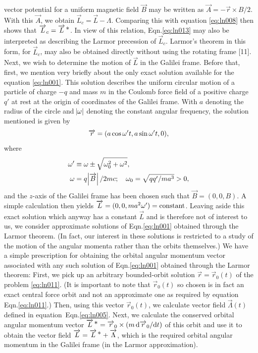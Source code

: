 vector potential for a uniform magnetic field $\vec{B}$ may 
be written as $\vec{A} = -\vec{r}\times{B}/2$. With this 
$\vec{A}$, we obtain $\vec{L}_{c} = \vec{L} - \Lambda$. 
Comparing this with equation \eqref{eq:ln008} then shows 
that $\overrightarrow{L}_{c} = {\overrightarrow{L}^{\,{\textstyle \ast}}}$. In view of this relation, 
Eqn.\eqref{eq:ln013} may also be interpreted as 
describing the Larmor precession of $\vec{L}_{c}$. Larmor's 
theorem in this form, for $\vec{L}_{c}$, may also be 
obtained directly without using the rotating frame [11]. 
Next, we wish to determine the motion of $\vec{L}$ in the 
Galilei frame. Before that, first, we mention very briefly 
about the only exact solution available for the equation 
\eqref{eq:ln001}. This solution describes the uniform 
circular  motion of a particle of charge $-q$ and mass $m$ 
in the Coulomb force field of a positive charge $q'$ at 
rest 
at the origin of coordinates of the Galilei frame. With $a$ 
denoting the radius of the circle and $\abs{{\omega}}$ denoting 
the constant angular frequency, the solution mentioned is 
given by
\begin{align*}
\overrightarrow{r} = (a \cos{\omega}' t, a \sin{\omega}' t, 0), 
\end{align*} 
where
\vspace{-1\bsk}
\begin{align*}
{\omega}' &\equiv {\omega} \pm
\sqrt{{\omega}_{0}^{2} + {\omega}^{2}},\notag\\
{\omega} 
&  = q \abs{\overrightarrow{B}}/2mc;\quad
{\omega}_{0}= \sqrt{qq'/ma^{3}} > 0, 
\end{align*} 
and the $z$-axis of the Galilei frame has been chosen such 
that  $\vec{B} = (0, 0, B)$. A simple calculation then 
yields $\overrightarrow{L} = (0, 0, ma^2 {\omega}')  = \text{constant}$. 
Leaving aside this exact solution which anyway has a 
constant $\vec{L}$ and is therefore not of interest to us, 
we consider approximate solutions of Eqn.\eqref{eq:ln001} 
obtained through the Larmor theorem. (In fact, our interest 
in these solutions is restricted to a study of the motion 
of 
the angular momenta rather than the orbits themselves.) We 
have a simple prescription for obtaining the orbital 
angular 
momentum vector associated with any such solution of 
Eqn.\eqref{eq:ln001} obtained through the Larmor theorem: 
First, we pick up an arbitrary bounded-orbit solution 
$\vec{r} = \vec{r}_{0}(t)$ of the problem \eqref{eq:ln011}. 
(It is important to note that $\vec{r}_{0}(t)$ so chosen is 
in fact an exact central force orbit and not an approximate 
one as required by equation Eqn.\eqref{eq:ln011}.) Then, 
using this vector $\vec{r}_{0}(t)$, we calculate vector 
field $\vec{\Lambda}(t)$ defined in 
equation~Eqn.\eqref{eq:ln005}. Next, we calculate the 
conserved orbital angular momentum vector  ${\overrightarrow{L}^{\,{\textstyle \ast}}} = 
{\overrightarrow{r}_{0}} \times(m\,\mathrm{d}{\overrightarrow{r}_{0}}/\mathrm{d} t)$ of this 
orbit and use it to obtain the vector field $\overrightarrow{L} = 
{\overrightarrow{L}^{\,{\textstyle \ast}}}+ \overrightarrow{\Lambda}$, which is the required orbital 
angular momentum in the Galilei frame (in the Larmor 
approximation).

